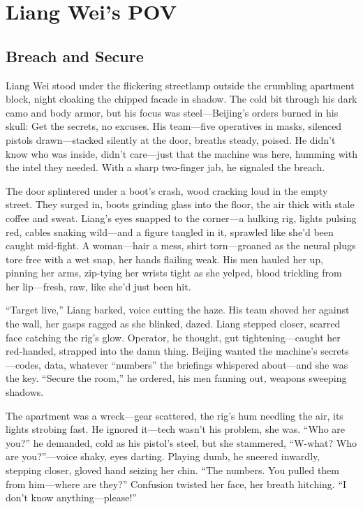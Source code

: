 \documentclass[12pt]{book}
\begin{document}
\chapter{Liang Wei’s POV}
\section{Breach and Secure}

Liang Wei stood under the flickering streetlamp outside the crumbling apartment block, night cloaking the chipped facade in shadow. The cold bit through his dark camo and body armor, but his focus was steel—Beijing’s orders burned in his skull: Get the secrets, no excuses. His team—five operatives in masks, silenced pistols drawn—stacked silently at the door, breaths steady, poised. He didn’t know who was inside, didn’t care—just that the machine was here, humming with the intel they needed. With a sharp two-finger jab, he signaled the breach.

The door splintered under a boot’s crash, wood cracking loud in the empty street. They surged in, boots grinding glass into the floor, the air thick with stale coffee and sweat. Liang’s eyes snapped to the corner—a hulking rig, lights pulsing red, cables snaking wild—and a figure tangled in it, sprawled like she’d been caught mid-fight. A woman—hair a mess, shirt torn—groaned as the neural plugs tore free with a wet snap, her hands flailing weak. His men hauled her up, pinning her arms, zip-tying her wrists tight as she yelped, blood trickling from her lip—fresh, raw, like she’d just been hit.

“Target live,” Liang barked, voice cutting the haze. His team shoved her against the wall, her gasps ragged as she blinked, dazed. Liang stepped closer, scarred face catching the rig’s glow. Operator, he thought, gut tightening—caught her red-handed, strapped into the damn thing. Beijing wanted the machine’s secrets—codes, data, whatever “numbers” the briefings whispered about—and she was the key. “Secure the room,” he ordered, his men fanning out, weapons sweeping shadows.

The apartment was a wreck—gear scattered, the rig’s hum needling the air, its lights strobing fast. He ignored it—tech wasn’t his problem, she was. “Who are you?” he demanded, cold as his pistol’s steel, but she stammered, “W-what? Who are you?”—voice shaky, eyes darting. Playing dumb, he sneered inwardly, stepping closer, gloved hand seizing her chin. “The numbers. You pulled them from him—where are they?” Confusion twisted her face, her breath hitching. “I don’t know anything—please!”
\end{document}
